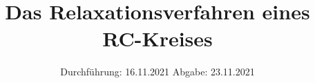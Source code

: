 

\subject{Versuch 353}
\title{Das Relaxationsverfahren eines RC-Kreises}
\date{%
  Durchführung: 16.11.2021
  \hspace{3em}
  Abgabe: 23.11.2021
}



\maketitle
\thispagestyle{empty}
\tableofcontents
\newpage







\nocite{*}
\printbibliography{}


